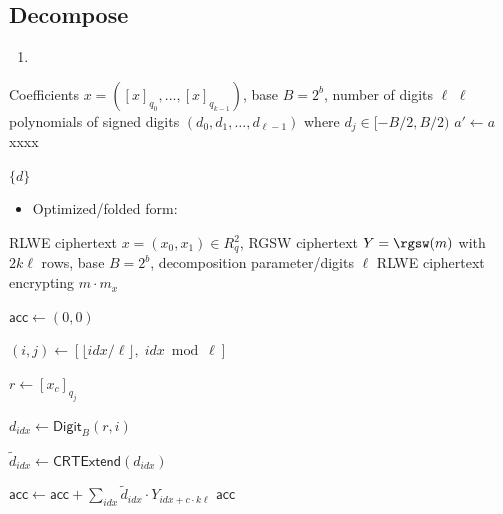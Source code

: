\subsection{Decompose}
\begin{enumerate}
    \item 
\end{enumerate}

\begin{algorithm}
\caption{BV Decompose (Optimized)}
\label{alg:bv:d}
\begin{algorithmic}[1]
\Require Coefficients $x = ([x]_{q_0}, ..., [x]_{q_{k-1}})$, base $B = 2^b$, number of digits $\ell$
\Ensure $\ell$ polynomials of signed digits $(d_0, d_1, \dots, d_{\ell-1})$ where $d_j \in [-B/2, B/2)$
\State $a' \gets a$
    \State xxxx
    
\EndFor
\State \Return $\{d\}$
\end{algorithmic}
\end{algorithm}

\begin{itemize}
    \item Optimized/folded form:
\end{itemize}

\begin{algorithm}
\caption{External Product $x \boxdot Y$ (Optimized BV-RGSW)}
\label{alg:bv:extprod}
\begin{algorithmic}[1]
    \Require RLWE ciphertext $x = (x_0, x_1) \in R_q^2$, RGSW ciphertext $Y=\rgsw(m)$ with $2k\ell$ rows, base $B = 2^b$, decomposition parameter/digits $\ell$
    \Ensure RLWE ciphertext encrypting $m \cdot m_x$
    
    \State $\mathsf{acc} \gets (0, 0)$

        \For{$idx \in [0, \ell \cdot k)$ \textbf{in parallel}}
            \State $(i, j) \gets [\lfloor idx/\ell \rfloor,\; idx \bmod \ell]$
        
            \State $r \gets [x_c]_{q_j}$
            
            \State $d_{idx} \gets \mathsf{Digit}_B(r, i)$

            \State $\tilde{d}_{idx} \gets \mathsf{CRTExtend}(d_{idx})$
            
        \EndFor
        \State $\mathsf{acc} \gets \mathsf{acc} + \sum_{idx} \tilde{d}_{idx} \cdot Y_{idx + c \cdot k\ell}$
    \EndFor
    \State \Return $\mathsf{acc}$
\end{algorithmic}
\end{algorithm}